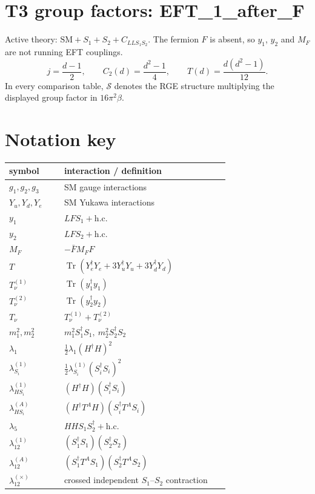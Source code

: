 \documentclass[9pt]{article}
\begin{document}
\section*{T3 group factors: EFT\_1\_after\_F}
Active theory: $\mathrm{SM}+S_1+S_2+C_{LLS_1S_2}$.  The fermion $F$ is absent, so $y_1$, $y_2$ and $M_F$ are not running EFT couplings.
\[j=\frac{d-1}{2},\qquad C_2(d)=\frac{d^2-1}{4},\qquad T(d)=\frac{d(d^2-1)}{12}.\]
In every comparison table, $\mathcal{S}$ denotes the RGE structure multiplying the displayed group factor in $16\pi^2\beta$.
\section*{Notation key}
\begin{longtable}{@{}p{0.23\linewidth}p{0.69\linewidth}@{}}
\toprule
symbol & interaction / definition \\
\midrule
$g_1,g_2,g_3$ & SM gauge interactions \\
$Y_u,Y_d,Y_e$ & SM Yukawa interactions \\
$y_1$ & $LFS_1+\mathrm{h.c.}$ \\
$y_2$ & $LFS_2+\mathrm{h.c.}$ \\
$M_F$ & $-\bar FM_FF$ \\
$T$ & $\operatorname{Tr}(Y_e^\dagger Y_e+3Y_u^\dagger Y_u+3Y_d^\dagger Y_d)$ \\
$T_\nu^{(1)}$ & $\operatorname{Tr}(y_1^\dagger y_1)$ \\
$T_\nu^{(2)}$ & $\operatorname{Tr}(y_2^\dagger y_2)$ \\
$T_\nu$ & $T_\nu^{(1)}+T_\nu^{(2)}$ \\
$m_1^2,m_2^2$ & $m_1^2S_1^\dagger S_1,\ m_2^2S_2^\dagger S_2$ \\
$\lambda_1$ & $\frac12\lambda_1(H^\dagger H)^2$ \\
$\lambda_{S_i}^{(1)}$ & $\frac12\lambda_{S_i}^{(1)}(S_i^\dagger S_i)^2$ \\
$\lambda_{HS_i}^{(1)}$ & $(H^\dagger H)(S_i^\dagger S_i)$ \\
$\lambda_{HS_i}^{(A)}$ & $(H^\dagger T^AH)(S_i^\dagger T^AS_i)$ \\
$\lambda_5$ & $HHS_1S_2^\dagger+\mathrm{h.c.}$ \\
$\lambda_{12}^{(1)}$ & $(S_1^\dagger S_1)(S_2^\dagger S_2)$ \\
$\lambda_{12}^{(A)}$ & $(S_1^\dagger T^AS_1)(S_2^\dagger T^AS_2)$ \\
$\lambda_{12}^{(\times)}$ & crossed independent $S_1$--$S_2$ contraction \\
\bottomrule
\end{longtable}
\end{document}
